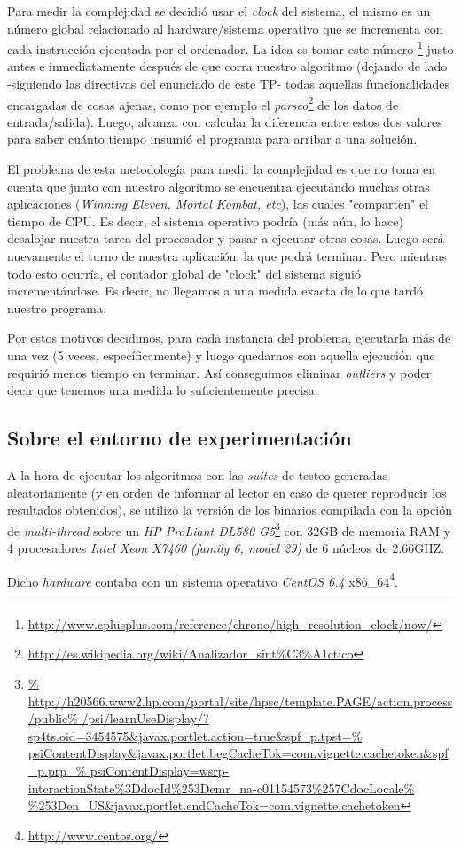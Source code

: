 \par Para medir la complejidad se decidi\'o usar el \emph{clock} del sistema,
    el mismo es un n\'umero global relacionado al hardware/sistema operativo
    que se incrementa con cada instrucci\'on ejecutada por el ordenador. La idea
    es tomar este n\'umero \footnote{%
    \url{http://www.cplusplus.com/reference/chrono/high_resolution_clock/now/}}
    justo antes e inmediatamente despu\'es de que corra nuestro algoritmo
    (dejando de lado -siguiendo las directivas del enunciado de este TP-
    todas aquellas funcionalidades encargadas de cosas ajenas, como
    por ejemplo el \emph{parseo}\footnote{%
    \url{http://es.wikipedia.org/wiki/Analizador_sint\%C3\%A1ctico}} de los datos
    de entrada/salida). Luego, alcanza con calcular la diferencia entre estos dos
    valores para saber cu\'anto tiempo insumi\'o el programa para arribar a una soluci\'on.

\par El problema de esta metodolog\'ia para medir la complejidad es que no
    toma en cuenta que junto con nuestro algoritmo se encuentra ejecut\'ando
    muchas otras aplicaciones (\emph{Winning Eleven, Mortal Kombat, etc}), las
    cuales "comparten" el tiempo de CPU. Es decir, el sistema operativo podr\'ia
    (m\'as a\'un, lo hace) desalojar nuestra tarea del procesador y pasar a
    ejecutar otras cosas. Luego ser\'a nuevamente el turno de nuestra
    aplicaci\'on, la que podr\'a terminar. Pero mientras todo esto ocurr\'ia,
    el contador global de "clock" del sistema sigui\'o increment\'andose. Es
    decir, no llegamos a una medida exacta de lo que tard\'o nuestro programa.

\par Por estos motivos decidimos, para cada instancia del problema, ejecutarla
    m\'as de una vez (5 veces, espec\'ificamente) y luego quedarnos con aquella
    ejecuci\'on que requiri\'o menos tiempo en terminar. As\'i
    conseguimos eliminar \emph{outliers} y poder decir que tenemos una medida
    lo suficientemente precisa.

{}
\subsection*{Sobre el entorno de experimentaci\'on}
\par A la hora de ejecutar los algoritmos con las \emph{suites} de testeo
    generadas aleatoriamente (y en orden de informar al lector en caso
    de querer reproducir los resultados obtenidos), se utiliz\'o la versi\'on
    de los binarios compilada con la opci\'on de \emph{multi-thread} sobre
    un \emph{HP ProLiant DL580 G5}\footnote{\url{%
    http://h20566.www2.hp.com/portal/site/hpsc/template.PAGE/action.process/public%
    /psi/learnUseDisplay/?sp4ts.oid=3454575&javax.portlet.action=true&spf_p.tpst=%
    psiContentDisplay&javax.portlet.begCacheTok=com.vignette.cachetoken&spf_p.prp_%
    psiContentDisplay=wsrp-interactionState\%3DdocId\%253Demr_na-c01154573\%257CdocLocale%
    \%253Den_US&javax.portlet.endCacheTok=com.vignette.cachetoken}} con 32GB
    de memoria RAM y 4 procesadores \emph{Intel Xeon X7460 (family 6, model 29)}
    de 6 n\'ucleos de 2.66GHZ.

\par Dicho \emph{hardware} contaba con un sistema operativo \emph{CentOS 6.4}
    x86\_64\footnote{\url{http://www.centos.org/}}.
